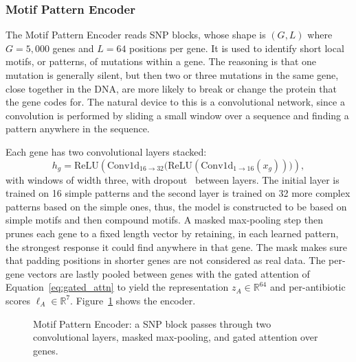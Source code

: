 \subsubsection{Motif Pattern Encoder}

The Motif Pattern Encoder reads SNP blocks, whose shape is $(G, L)$ where $G = 5{,}000$ genes
and $L = 64$ positions per gene. It is used to identify short local motifs, or patterns, of
mutations within a gene. The reasoning is that one mutation is generally silent, but then two or three mutations in
the same gene, close together in the DNA, are more likely to break or change the protein that
the gene codes for.
The natural device to this is a convolutional network, since a convolution is performed by
sliding a small window over a sequence and finding a pattern anywhere in the sequence.

Each gene has two convolutional layers stacked:
\begin{equation}
h_g = \mathrm{ReLU}\!\left(\mathrm{Conv1d}_{16 \to 32}\big(\mathrm{ReLU}(\mathrm{Conv1d}_{1 \to 16}(x_g))\big)\right),
\label{eq:expertA_conv}
\end{equation}
with windows of width three, with dropout~\cite{srivastava2014dropout} between layers. The
initial layer is trained on 16 simple patterns and the second layer is trained on 32 more
complex patterns based on the simple ones, thus, the model is constructed to be based on
simple motifs and then compound motifs. A masked max-pooling step then prunes each gene to a
fixed length vector by retaining, in each learned pattern, the strongest response it could
find anywhere in that gene. The mask makes sure that padding positions in shorter genes are
not considered as real data. The per-gene vectors are lastly pooled between genes with the
gated attention of Equation~\eqref{eq:gated_attn} to yield the representation
$z_A \in \mathbb{R}^{64}$ and per-antibiotic scores $\ell_A \in \mathbb{R}^{7}$.
Figure~\ref{fig:expertA} shows the encoder.

\begin{figure}[H]
  \centering
  \resizebox{\textwidth}{!}{}
  \caption{Motif Pattern Encoder: a SNP block passes through two convolutional layers, masked max-pooling, and gated attention over genes.}
  \label{fig:expertA}
\end{figure}

